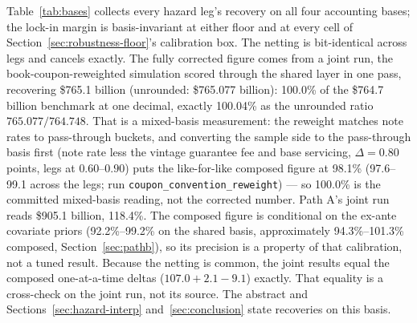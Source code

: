 \documentclass[12pt]{article}
\begin{document}
Table~\ref{tab:bases} collects every hazard leg's recovery on all four accounting bases; the lock-in margin is basis-invariant at either floor and at every cell of Section~\ref{sec:robustness-floor}'s calibration box. The netting is bit-identical across legs and cancels exactly. The fully corrected figure comes from a joint run, the book-coupon-reweighted simulation scored through the shared layer in one pass, recovering \$765.1 billion (unrounded: \$765.077 billion): 100.0\% of the \$764.7 billion benchmark at one decimal, exactly 100.04\% as the unrounded ratio $765.077/764.748$. That is a mixed-basis measurement: the reweight matches note rates to pass-through buckets, and converting the sample side to the pass-through basis first (note rate less the vintage guarantee fee and base servicing, $\Delta = 0.80$ points, legs at $0.60$--$0.90$) puts the like-for-like composed figure at 98.1\% (97.6--99.1 across the legs; run \texttt{coupon\_convention\_reweight}) --- so 100.0\% is the committed mixed-basis reading, not the corrected number. Path A's joint run reads \$905.1 billion, 118.4\%. The composed figure is conditional on the ex-ante covariate priors (92.2\%--99.2\% on the shared basis, approximately 94.3\%--101.3\% composed, Section~\ref{sec:pathb}), so its precision is a property of that calibration, not a tuned result. Because the netting is common, the joint results equal the composed one-at-a-time deltas ($107.0 + 2.1 - 9.1$) exactly. That equality is a cross-check on the joint run, not its source. The abstract and Sections~\ref{sec:hazard-interp} and~\ref{sec:conclusion} state recoveries on this basis.
\end{document}
